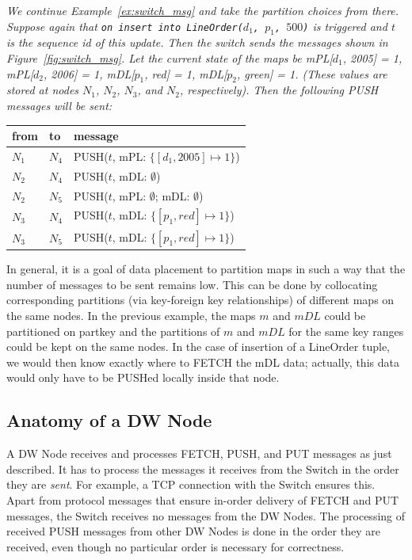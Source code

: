 \begin{example}\em
\label{ex:switch_msg2}
We continue Example~\ref{ex:switch_msg} and take the partition choices
from there.
Suppose again that
{\tt on insert into LineOrder($d_1$, $p_1$, $500$)} is triggered and $t$ is
the sequence id of this update.
Then the switch sends the messages shown in Figure~\ref{fig:switch_msg}.
%
Let the current state of the maps be
mPL[$d_1$, 2005] = 1, mPL[$d_2$, 2006] = 1, mDL[$p_1$, red] = 1,
mDL[$p_2$, green] = 1. (These values are stored at nodes
$N_1$, $N_2$, $N_3$, and $N_2$, respectively).
Then the following PUSH messages will be sent:
\begin{center}
\begin{tabular}{ll|l}
from & to & message \\
\hline
$N_1$ & $N_4$ & PUSH($t$, mPL: $\{ [d_1, 2005] \mapsto 1 \}$) \\
$N_2$ & $N_4$ & PUSH($t$, mDL: $\emptyset$) \\
$N_2$ & $N_5$ & PUSH($t$, mPL: $\emptyset$; mDL: $\emptyset$) \\
$N_3$ & $N_4$ & PUSH($t$, mDL: $\{ [p_1, red] \mapsto 1 \}$) \\
$N_3$ & $N_5$ & PUSH($t$, mDL: $\{ [p_1, red] \mapsto 1 \}$) \\
\end{tabular}
\end{center}
\end{example}


In general, it is a goal of data placement
to partition maps in such a way that the number of
messages to be sent remains low. This can be done by collocating
corresponding partitions (via key-foreign key relationships)
of different maps on the same nodes.
In the previous example, the maps $m$ and $mDL$
could be partitioned on partkey and the partitions of $m$ and $mDL$ for the
same key ranges could be kept on the same nodes.
In the case of insertion of a LineOrder tuple, we would then know exactly
where to FETCH the mDL data; actually, this data would only have to be
PUSHed locally inside that node.


\subsection{Anatomy of a DW Node}


A DW Node receives and processes FETCH, PUSH, and PUT messages
as just described.
It has to process the messages it receives from the Switch 
in the order they are {\em sent}\/. For example, a
TCP connection with the Switch ensures this. Apart from protocol messages
that ensure in-order delivery of FETCH and PUT messages, the Switch receives no
messages from the DW Nodes.
The processing of received PUSH messages from other DW Nodes is done in the
order they are received, even though no particular order is
necessary for correctness.

